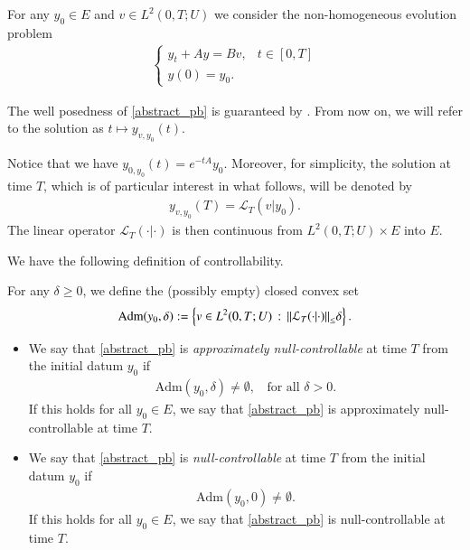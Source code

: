 For any $y_0\in E$ and $v\in L^2(0,T;U)$ we consider the non-homogeneous evolution problem  
\begin{align}\label{abstract_pb}
	\begin{cases}
		y_t+Ay=Bv, & t\in[0,T]
		\\
		y(0)=y_0.
	\end{cases}
\end{align}

The well posedness of \eqref{abstract_pb} is guaranteed by \cite[Theorem 2.37]{coron2007control}. From now on, we will refer to the solution as $t\mapsto y_{v,y_0}(t)$.

Notice that we have $y_{0,y_0}(t)= e^{-tA}y_0$. Moreover, for simplicity, the solution at time $T$, which is of particular interest in what follows, will be denoted by 
\begin{align*}
	y_{v,y_0}(T)=\mathcal{L}_T(v|y_0).
\end{align*} 
The linear operator $\mathcal{L}_T(\cdot|\cdot)$ is then continuous from $L^2(0,T;U)\times E$ into $E$.

We have the following definition of controllability.

\begin{definition}
For any $\delta\geq 0$, we define the (possibly empty) closed convex set 
\begin{align*}
	\textrm{Adm}(y_0,\delta):=\left\{v\in L^2(0,T;U)\,:\, {\left\|\mathcal{L}_T(\cdot|\cdot)\right\|}_{\leq}\delta\right\}.
\end{align*}
\begin{itemize}
	\item We say that \eqref{abstract_pb} is \textit{approximately null-controllable} at time $T$ from the initial datum $y_0$ if 
	\begin{align*}
		\textrm{Adm}(y_0,\delta)\neq\emptyset,\;\;\textrm{ for all } \delta>0.
	\end{align*}  
	If this holds for all $y_0\in E$, we say that \eqref{abstract_pb} is approximately null-controllable at time $T$. 
	
	\item We say that \eqref{abstract_pb} is \textit{null-controllable} at time $T$ from the initial datum $y_0$ if 
	\begin{align*}
		\textrm{Adm}(y_0,0)\neq\emptyset.
	\end{align*}	
	If this holds for all $y_0\in E$, we say that \eqref{abstract_pb} is null-controllable at time $T$.
\end{itemize} 
\end{definition}

